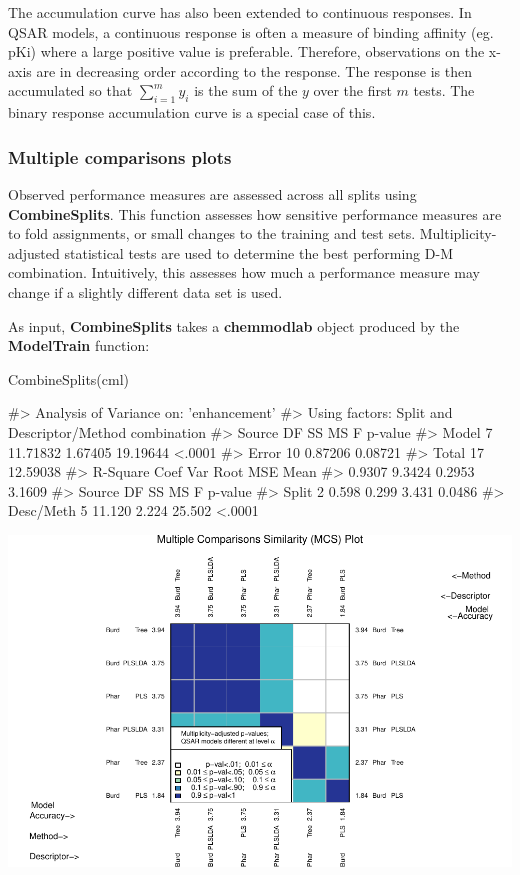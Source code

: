 The accumulation curve has also been extended to continuous responses.
In QSAR models, a continuous response is often a measure of binding
affinity (eg. pKi) where a large positive value is preferable.
Therefore, observations on the x-axis are in decreasing order according
to the response. The response is then accumulated so that
\(\sum_{i=1}^{m} y_i\) is the sum of the \(y\) over the first \(m\)
tests. The binary response accumulation curve is a special case of this.

\subsubsection{Multiple comparisons
plots}\label{multiple-comparisons-plots}

Observed performance measures are assessed across all splits using
\textbf{CombineSplits}. This function assesses how sensitive performance
measures are to fold assignments, or small changes to the training and
test sets. Multiplicity-adjusted statistical tests are used to determine
the best performing D-M combination. Intuitively, this assesses how much
a performance measure may change if a slightly different data set is
used.

As input, \textbf{CombineSplits} takes a \textbf{chemmodlab} object
produced by the \textbf{ModelTrain} function:

\begin{Schunk}
\begin{Sinput}
CombineSplits(cml)
\end{Sinput}
\begin{Soutput}
#>    Analysis of Variance on: 'enhancement'
#>  Using factors: Split and Descriptor/Method combination
#> Source    DF         SS         MS          F   p-value   
#> Model      7   11.71832    1.67405   19.19644    <.0001   
#> Error     10    0.87206    0.08721   
#> Total     17   12.59038   
#>       R-Square   Coef Var   Root MSE       Mean   
#>         0.9307     9.3424     0.2953     3.1609   
#> Source       DF       SS       MS        F   p-value   
#> Split         2    0.598    0.299    3.431    0.0486   
#> Desc/Meth     5   11.120    2.224   25.502    <.0001
\end{Soutput}

\includegraphics{chemmodlabRJournal_files/figure-latex/CombineSplits_ie-1} \end{Schunk}

